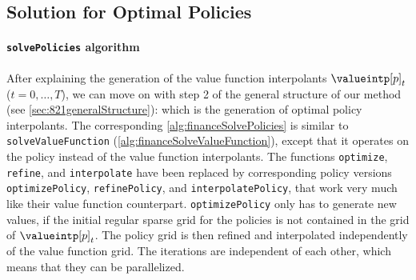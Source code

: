 \subsection{Solution for Optimal Policies}
\label{sec:827solvePolicies}

\paragraph{\texttt{solvePolicies} algorithm}

After explaining the generation of the value function interpolants
$\valueintp[p]_t$ ($t = 0, \dotsc, T$),
we can move on with step 2 of the general structure of our method
(see \cref{sec:821generalStructure}):
which is the generation of optimal policy interpolants.
The corresponding \cref{alg:financeSolvePolicies} is similar to
\texttt{solveValueFunction} (\cref{alg:financeSolveValueFunction}),
except that it operates on the policy instead of
the value function interpolants.
The functions \texttt{optimize}, \texttt{refine}, and \texttt{interpolate}
have been replaced by corresponding policy versions
\texttt{optimizePolicy}, \texttt{refinePolicy}, and \texttt{interpolatePolicy},
that work very much like their value function counterpart.
\texttt{optimizePolicy} only has to generate new values,
if the initial regular sparse grid for the policies
is not contained in the grid of $\valueintp[p]_t$.
The policy grid is then refined and interpolated independently
of the value function grid.
The iterations are independent of each other,
which means that they can be parallelized.

\begin{algorithm}
  \begin{algorithmic}[1]
      \EndFor{}
    \EndFunction{}
  \end{algorithmic}
  \caption[%
    Generation of interpolants for optimal policies (\texttt{solvePolicies})%
  ]{%
    Generation of interpolants for optimal policies.
    The input is the higher-order B-spline interpolant $\valueintp[p]_t$
    of the value function for all $t = 0, \dotsc, T$.
    The output is the higher-order B-spline interpolant $\optpolicyintp[p]_t$
    of the optimal policies for all $t = 0, \dotsc, T$.%
  }%
  \label{alg:financeSolvePolicies}%
\end{algorithm}



